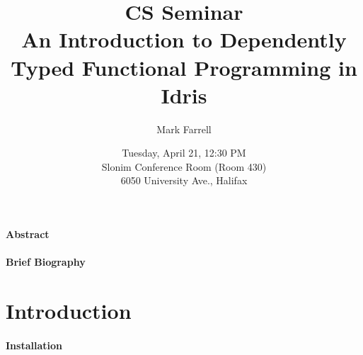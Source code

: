 \documentclass[twocolumn, 10pt, english]{article}
\title{
  \large CS Seminar \\
  \normalsize An Introduction to Dependently Typed Functional Programming in Idris
}
\date{
  \normalsize
  Tuesday, April 21, 12:30 PM \\
  Slonim Conference Room (Room 430) \\
  6050 University Ave., Halifax
}
\author{\normalsize Mark Farrell}
\begin{document}
\maketitle
\thispagestyle{empty}

\paragraph{Abstract}











\paragraph{Brief Biography}



\newpage

\section{Introduction}



\paragraph{Installation}


\newpage



\end{document}

